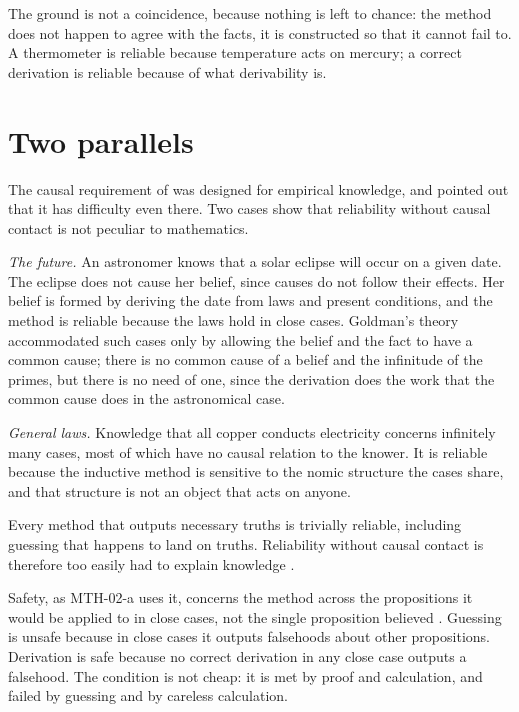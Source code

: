 \documentclass{situationist-preprint}
\begin{document}
The ground is not a coincidence, because nothing is left to chance: the method does not happen to agree with the facts, it is constructed so that it cannot fail to. A thermometer is reliable because temperature acts on mercury; a correct derivation is reliable because of what derivability is.

\section{Two parallels}\label{s:par}

The causal requirement of \citet{Goldman1967} was designed for empirical knowledge, and \citet{Steiner1973} pointed out that it has difficulty even there. Two cases show that reliability without causal contact is not peculiar to mathematics.

\emph{The future.} An astronomer knows that a solar eclipse will occur on a given date. The eclipse does not cause her belief, since causes do not follow their effects. Her belief is formed by deriving the date from laws and present conditions, and the method is reliable because the laws hold in close cases. Goldman's theory accommodated such cases only by allowing the belief and the fact to have a common cause; there is no common cause of a belief and the infinitude of the primes, but there is no need of one, since the derivation does the work that the common cause does in the astronomical case.

\emph{General laws.} Knowledge that all copper conducts electricity concerns infinitely many cases, most of which have no causal relation to the knower. It is reliable because the inductive method is sensitive to the nomic structure the cases share, and that structure is not an object that acts on anyone.

\begin{objection}
Every method that outputs necessary truths is trivially reliable, including guessing that happens to land on truths. Reliability without causal contact is therefore too easily had to explain knowledge \citep{ClarkeDoane2017}.
\end{objection}

\begin{reply}
Safety, as MTH-02-a uses it, concerns the method across the propositions it would be applied to in close cases, not the single proposition believed \citep{Williamson2000,Pritchard2005}. Guessing is unsafe because in close cases it outputs falsehoods about other propositions. Derivation is safe because no correct derivation in any close case outputs a falsehood. The condition is not cheap: it is met by proof and calculation, and failed by guessing and by careless calculation.
\end{reply}
\end{document}
